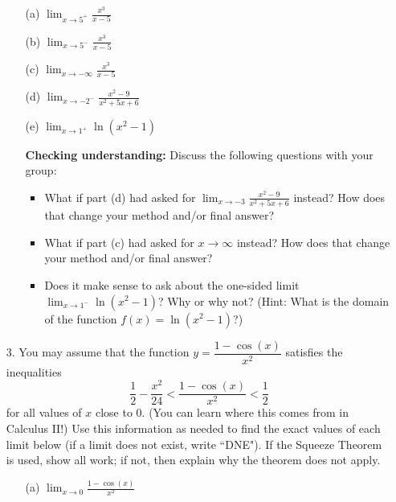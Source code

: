 \documentclass[12pt]{exam}
\begin{document}
\begin{enumerate}
\begin{enumerate}
\item[(a)] $\displaystyle\lim_{x\to 5^+}\frac{x^3}{x-5}$

\vfill

\item[(b)] $\displaystyle\lim_{x\to 5^-}\frac{x^3}{x-5}$

\vfill

\item[(c)] $\displaystyle \lim_{x \rightarrow -\infty} \frac{x^3}{x-5}$
\vfill

\item[(d)] $\displaystyle\lim_{x\to -2^-}\frac{x^2-9}{x^2+5x+6}$

\vfill

\item[(e)] $\displaystyle\lim_{x\to 1^+}\ln(x^2-1)$

\vfill


{\bf Checking understanding:} Discuss the following questions with your group:

	\begin{itemize}	
	\item What if part (d) had asked for $\displaystyle\lim_{x\to -3}\frac{x^2-9}{x^2+5x+6}$ instead? How does that change your method and/or final answer?

  \item What if part (c) had asked for $x \to \infty$ instead? How does that change your method and/or final answer?
	
	\item Does it make sense to ask about the one-sided limit $\displaystyle\lim_{x\to 1^-}\ln(x^2-1)$? Why or why not? (Hint: What is the domain of the function $f(x)=\ln(x^2-1)$?)
	
	\end{itemize}

\end{enumerate}
\newpage
\item[3.] You may assume that the function $y=\dfrac{1-\cos(x)}{x^2}$ satisfies the inequalities
$$\frac{1}{2}-\frac{x^2}{24}<\frac{1-\cos(x)}{x^2}<\frac{1}{2}$$
for all values of $x$ close to $0$. (You can learn where this comes from in Calculus II!) Use this information as needed to find the exact values of each limit below (if a limit does not exist, write ``DNE"). If the Squeeze Theorem is used, show all work; if not, then explain why the theorem does not apply.

\begin{enumerate}

\item[(a)] $\displaystyle\lim_{x\to 0}\frac{1-\cos(x)}{x^2}$


\end{enumerate}
\end{enumerate}
\end{document}
